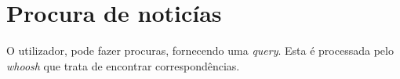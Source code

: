 \section{Procura de noticías}
O utilizador, pode fazer procuras, fornecendo uma \textit{query}. Esta é processada pelo \textit{whoosh} que trata de encontrar correspondências.
